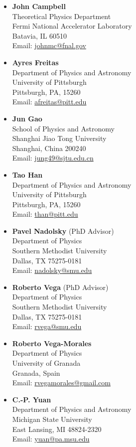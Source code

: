 \documentclass[12pt]{article}
\newcommand{\email}[1]{\href{mailto:#1}{#1}}
\begin{document}
\begin{multicols}{2}
\begin{itemize}
\item \textbf{John Campbell}\\
Theoretical Physics Department\\
Fermi National Accelerator Laboratory\\
Batavia, IL 60510\\
Email: \email{johnmc@fnal.gov}
\item \textbf{Ayres Freitas}\\
Department of Physics and Astronomy\\
University of Pittsburgh\\
Pittsburgh, PA, 15260\\
Email: \email{afreitas@pitt.edu}
\item \textbf{Jun Gao}\\
School of Physics and Astronomy\\
Shanghai Jiao Tong University\\
Shanghai, China 200240\\
Email: \email{jung49@sjtu.edu.cn}
\item \textbf{Tao Han}\\
Department of Physics and Astronomy\\
University of Pittsburgh\\
Pittsburgh, PA, 15260\\
Email: \email{than@pitt.edu}
\item \textbf{Pavel Nadolsky} (PhD Advisor) \\
Department of Physics\\
Southern Methodist University\\
Dallas, TX 75275-0181 \\
Email: \email{nadolsky@smu.edu}
\item \textbf{Roberto Vega} (PhD Advisor)\\
Department of Physics\\
Southern Methodist University\\
Dallas, TX 75275-0181 \\
Email: \email{rvega@smu.edu}
\item \textbf{Roberto Vega-Morales}\\
Department of Physics\\
University of Granada\\
Granada, Spain\\
Email: \email{rvegamorales@gmail.com}
\item \textbf{C.-P. Yuan}\\
Department of Physics and Astronomy\\
Michigan State University\\
East Lansing, MI 48824-2320\\
Email: \email{yuan@pa.msu.edu}
\end{itemize}
 \end{multicols}
\end{document}
